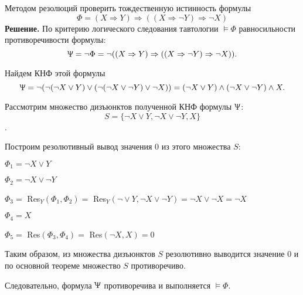 \begin{example}
    Методом резолюций проверить тождественную истинность формулы 
    $$\Phi=(X\Rightarrow Y)\Rightarrow((X\Rightarrow\lnot Y)\Rightarrow\lnot X)$$
    \textbf{Решение.} По критерию логического следования тавтологии $\models \Phi$ равносильности противоречивости формулы: $$\Uppsi = \lnot\Phi = \lnot((X\Rightarrow Y)\Rightarrow ((X\Rightarrow\lnot Y)\Rightarrow\lnot X)).$$

    Найдем КНФ этой формулы $$\Uppsi = \lnot(\lnot(\lnot X\lor Y)\lor(\lnot(\lnot X\lor\lnot Y)\lor\lnot X)) = (\lnot X\lor Y)\land(\lnot X\lor\lnot Y)\land X.$$

    Рассмотрим множество дизъюнктов полученной КНФ формулы $\Uppsi$:
    $$S = \{\lnot X\lor Y,\lnot X\lor\lnot Y, X\}$$.

    Построим резолютивный вывод значения 0 из этого множества $S$:

    $\Phi_1 = \lnot X\lor Y$

    $\Phi_2 = \lnot X\lor\lnot Y$

    $\Phi_3 =$ Res$_Y(\Phi_1,\Phi_2) =$ Res$_Y(\lnot\lor Y,\lnot X\lor\lnot Y) = \lnot X\lor\lnot X = \lnot X$ 

    $\Phi_4 = X$

    $\Phi_5 = $ Res$(\Phi_3,\Phi_4) = $ Res$(\lnot X, X) = 0$

    Таким образом, из множества дизъюнктов $S$ резолютивно выводится значение 0 и по основной теореме множество $S$ противоречиво. 

    Следовательно, формула $\Uppsi$ противоречива и выполняется $\models\Phi$.
\end{example}